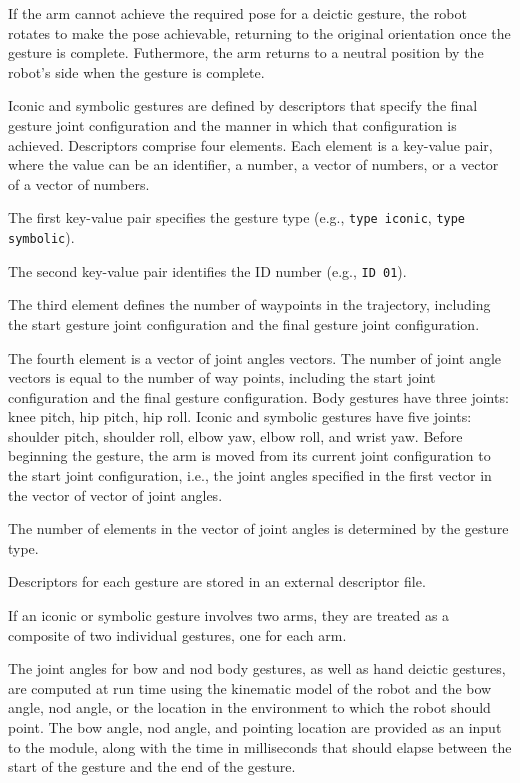 \documentclass{CSSRforAfrica}
\begin{document}
{If the arm cannot achieve the required pose for a deictic gesture, the robot  rotates to make the pose achievable, returning to the original orientation once the gesture is complete.  Futhermore, the arm  returns to a neutral position by the robot's side when the gesture is complete.

Iconic and symbolic gestures are defined by descriptors that specify the final gesture joint configuration and the manner in which that configuration is achieved.  
Descriptors comprise four elements. Each element is a key-value pair, where the value can be an identifier, a number, a vector of numbers, or a vector of a vector of numbers. 

The first key-value pair  specifies  the gesture type (e.g., {\small \verb+type iconic+}, {\small \verb+type symbolic+}).  

The second key-value pair  identifies the  ID number (e.g., {\small \verb+ID 01+}).

The third element defines the number of waypoints in the trajectory, including the start gesture joint configuration and  the final gesture joint configuration.  

The fourth element is a vector of joint angles vectors. The number of joint angle vectors is equal to the number of way points, including the start joint configuration and the final gesture configuration.  Body gestures have three joints: knee pitch, hip pitch, hip roll. Iconic and symbolic gestures have five joints: shoulder pitch, shoulder roll, elbow yaw, elbow roll, and wrist yaw. Before beginning the gesture, the arm is moved from its current joint configuration to the start joint configuration, i.e., the joint angles specified in the first vector in the vector of vector of joint angles.  

The number of elements in the vector of joint angles is determined by the gesture type. 

Descriptors for each gesture are stored in an external descriptor file. 
 
If an iconic or symbolic gesture involves two arms, they are treated as a composite of two individual gestures, one for each arm.
 
The joint angles for bow and nod body gestures, as well as hand deictic gestures,  are computed at run time using the kinematic model of the robot and the bow angle, nod angle, or the location in the environment to which the robot should point.  
The bow angle, nod angle, and pointing location  are provided as an input to the module, along with the time  in milliseconds that should elapse between the start of the gesture and the end of the gesture. 

}
\end{document}

